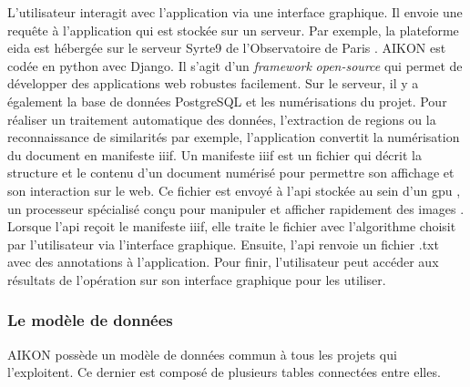 L'utilisateur interagit avec l'application via une interface graphique. Il envoie une requête à l'application qui est stockée sur un serveur. Par exemple, la plateforme \gls{eida} est hébergée sur le serveur Syrte9 de l'Observatoire de Paris . AIKON est codée en python avec Django. Il s'agit d'un \textit{framework} \textit{open-source} qui permet de développer des applications web robustes facilement. Sur le serveur, il y a également la base de données PostgreSQL et les numérisations du projet. Pour réaliser un traitement automatique des données, l'extraction de regions ou la reconnaissance de similarités par exemple, l'application convertit la numérisation du document en manifeste \gls{iiif}. Un manifeste \gls{iiif} est un fichier qui décrit la structure et le contenu d'un document numérisé pour permettre son affichage et son interaction sur le web. Ce fichier est envoyé à l'\gls{api} stockée au sein d'un \gls{gpu} , un processeur spécialisé conçu pour manipuler et afficher rapidement des images . Lorsque l'\gls{api} reçoit le manifeste \gls{iiif}, elle traite le fichier avec l'algorithme choisit par l'utilisateur via l'interface graphique. Ensuite, l'\gls{api} renvoie un fichier .txt avec des annotations à l'application.  Pour finir, l'utilisateur peut accéder aux résultats de l'opération sur son interface graphique pour les utiliser.

\subsubsection{Le modèle de données}

AIKON possède un modèle de données commun à tous les projets qui l'exploitent. Ce dernier est composé de plusieurs tables connectées entre elles. 

